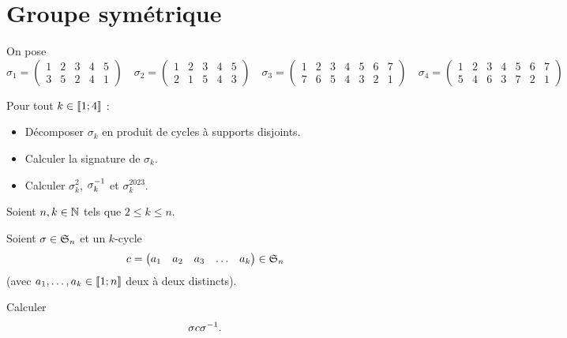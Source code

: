 \chapter{Groupe symétrique}

\minitoc

\begin{exo}[Exercice 1]
On pose \[\sigma_1=\begin{pmatrix}
1 & 2 & 3 & 4 & 5 \\
3 & 5 & 2 & 4 & 1
\end{pmatrix}\quad\sigma_2=\begin{pmatrix}
1 & 2 & 3 & 4 & 5 \\
2 & 1 & 5 & 4 & 3
\end{pmatrix}\quad\sigma_3=\begin{pmatrix}
1 & 2 & 3 & 4 & 5 & 6 & 7 \\
7 & 6 & 5 & 4 & 3 & 2 & 1
\end{pmatrix}\quad\sigma_4=\begin{pmatrix}
1 & 2 & 3 & 4 & 5 & 6 & 7 \\
5 & 4 & 6 & 3 & 7 & 2 & 1
\end{pmatrix}\]

Pour tout \(k\in\interventierii{1}{4}\) :

\begin{itemize}
\item Décomposer \(\sigma_k\) en produit de cycles à supports disjoints. \\

\item Calculer la signature de \(\sigma_k\). \\

\item Calculer \(\sigma_k^2\), \(\sigma_k\inv\) et \(\sigma_k^{2023}\).
\end{itemize}
\end{exo}

\begin{corr}
\end{corr}

\begin{exo}
Soient \(n,k\in\N\) tels que \(2\leq k\leq n\).

Soient \(\sigma\in\S{n}\) et un \(k\)-cycle \[c=\begin{pmatrix}a_1 & a_2 & a_3 & \dots & a_k\end{pmatrix}\in\S{n}\] (avec \(a_1,\dots,a_k\in\interventierii{1}{n}\) deux à deux distincts).

Calculer \[\sigma c\sigma\inv.\]
\end{exo}

